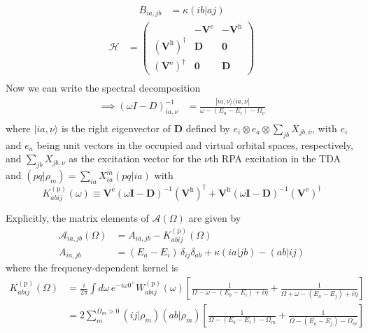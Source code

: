 \begin{align}
    B_{ia,jb} &= \kappa (ib|aj)
\end{align}
\begin{align}
\mathcal{H} &= \begin{pmatrix}
\mathbf{} & -\mathbf{V}^{\mathrm{e}} & -\mathbf{V}^{\mathrm{h}} \\
\left(\mathbf{V}^{\mathrm{h}}\right)^{\dagger} & \mathbf{D} & \mathbf{0} \\
\left(\mathbf{V}^{\mathrm{e}}\right)^{\dagger} & \mathbf{0} & \mathbf{D}
\end{pmatrix} \\
\end{align}
Now we can write the spectral decomposition 
\begin{align}
\implies \left(\omega {I} - {D}\right)_{ia,\nu}^{-1} &= \frac{|ia,\nu\rangle \langle ia,\nu|}{\omega - (E_a - E_i) - \Omega_{\nu}} \\
\end{align}
where $|ia,\nu\rangle$ is the right eigenvector of $\bm{D}$ defined by $e_i \otimes e_a \otimes \sum_{jb} X_{jb,\nu}$, with $e_i$ and $e_a$ being unit vectors in the occupied and virtual orbital spaces, respectively, and $\sum_{jb} X_{jb,\nu}$ as the excitation vector for the $\nu$th RPA excitation in the TDA and  $\left(p q | \rho_m\right)=\sum_{i a} X_{i a}^m(p q | i a)$ with
\begin{equation}
 K_{abij}^{(\mathrm{p})}(\omega)\equiv  \mathbf{V}^{\mathrm{e}}(\omega \mathbf{I} - \mathbf{D})^{-1} (\mathbf{V}^{\mathrm{h}})^{\dagger} + \mathbf{V}^{\mathrm{h}}(\omega \mathbf{I} - \mathbf{D})^{-1} (\mathbf{V}^{\mathrm{e}})^{\dagger}
\end{equation}

Explicitly, the matrix elements of $\mathcal{A}(\Omega)$ are given by
\begin{align}
\mathcal{A}_{ia,jb}(\Omega) &= A_{ia,jb} - K_{abij}^{(\mathrm{p})}(\Omega) \\
A_{ia,jb} &= (E_a - E_i)\,\delta_{ij}\delta_{ab} + \kappa (ia|jb) - (ab|ij)
\end{align}
where the frequency-dependent kernel is
\begin{align}
K_{abij}^{(\mathrm{p})}(\Omega) &= \frac{i}{2\pi} \int d\omega\, e^{-i\omega 0^+} W_{abij}^{(\mathrm{p})}(\omega) \left[ \frac{1}{\Omega - \omega - (E_b - E_i) + i\eta} + \frac{1}{\Omega + \omega - (E_a - E_j) + i\eta} \right]\\
&= 2 \sum_m^{\Omega_m>0}\left(i j| \rho_m\right)\left(a b|\rho_m\right)\left[\frac{1}{\Omega-\left(E_b-E_i\right)-\Omega_m}+\frac{1}{\Omega-\left(E_a-E_j\right)-\Omega_m}\right]
\end{align}


